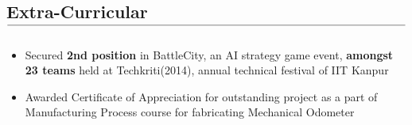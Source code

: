 \documentclass[10pt,letterpaper]{article}
\newcommand\tline[2]{$\underset{\text{#1}}{\text{\underline{\hspace{#2}}}}$}
\begin{document}
\vspace{-1.8em}
\subsection*{Extra-Curricular\tline{}{5.65in}}
\vspace{-0.75em}

\begin{itemize}
	\setlength{\itemsep}{3pt}
		\item Secured \textbf{2nd position} in BattleCity, an AI strategy game event, \textbf{amongst 23 teams} held at Techkriti(2014), annual technical festival of IIT Kanpur
\item Awarded Certificate of Appreciation for outstanding project as a part of Manufacturing Process course for
fabricating Mechanical Odometer
		
		
	\end{itemize}
\end{document}
